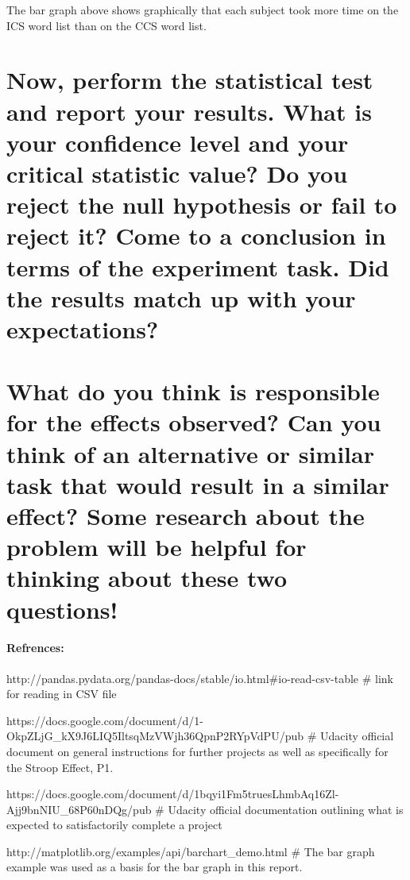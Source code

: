 \documentclass{article}
\begin{document}
    The bar graph above shows graphically that each subject took more time
on the ICS word list than on the CCS word list.

    \section{Now, perform the statistical test and report your results. What
is your confidence level and your critical statistic value? Do you
reject the null hypothesis or fail to reject it? Come to a conclusion in
terms of the experiment task. Did the results match up with your
expectations?}\label{now-perform-the-statistical-test-and-report-your-results.-what-is-your-confidence-level-and-your-critical-statistic-value-do-you-reject-the-null-hypothesis-or-fail-to-reject-it-come-to-a-conclusion-in-terms-of-the-experiment-task.-did-the-results-match-up-with-your-expectations}

\section{What do you think is responsible for the effects observed? Can
you think of an alternative or similar task that would result in a
similar effect? Some research about the problem will be helpful for
thinking about these two
questions!}\label{what-do-you-think-is-responsible-for-the-effects-observed-can-you-think-of-an-alternative-or-similar-task-that-would-result-in-a-similar-effect-some-research-about-the-problem-will-be-helpful-for-thinking-about-these-two-questions}

    \paragraph{Refrences:}\label{refrences}

http://pandas.pydata.org/pandas-docs/stable/io.html\#io-read-csv-table
\# link for reading in CSV file

https://docs.google.com/document/d/1-OkpZLjG\_kX9J6LIQ5IltsqMzVWjh36QpnP2RYpVdPU/pub
\# Udacity official document on general instructions for further
projects as well as specifically for the Stroop Effect, P1.

https://docs.google.com/document/d/1bqyi1Fm5truesLhmbAq16Zl-Ajj9bnNIU\_68P60nDQg/pub
\# Udacity official documentation outlining what is expected to
satisfactorily complete a project

http://matplotlib.org/examples/api/barchart\_demo.html \# The bar graph
example was used as a basis for the bar graph in this report.
\end{document}
